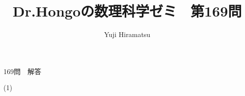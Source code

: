 \documentclass[a4j,10pt,oneside,openany]{jsbook}
\title{{\Huge \textbf{Dr.Hongoの数理科学ゼミ　第169問}}\\}
\author{Yuji Hiramatsu}
\date{}
\begin{document}
%
%
\maketitle
%
%


{\Huge 169問　解答}

\vspace{3\baselineskip}


{\Large (1)}
\\
\\
\end{document}
